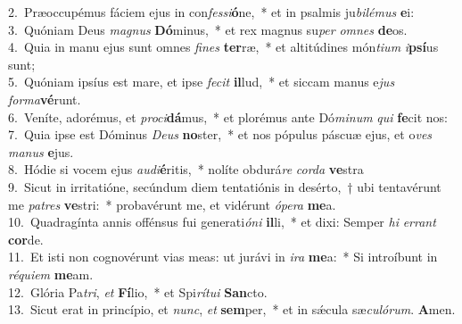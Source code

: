 {2.~}Præoccupémus fáciem ejus in con\textit{fes}\textit{si}\textbf{ó}ne,~* et in psalmis ju\textit{bi}\textit{lé}\textit{mus} \textbf{e}i:\\
{3.~}Quóniam Deus \textit{ma}\textit{gnus} \textbf{Dó}minus,~* et rex magnus su\textit{per} \textit{om}\textit{nes} \textbf{de}os.\\
{4.~}Quia in manu ejus sunt omnes \textit{fi}\textit{nes} \textbf{ter}ræ,~* et altitúdines món\textit{ti}\textit{um} \textit{i}\textbf{psí}us sunt;\\
{5.~}Quóniam ipsíus est mare, et ipse \textit{fe}\textit{cit} \textbf{il}lud,~* et siccam manus e\textit{jus} \textit{for}\textit{ma}\textbf{vé}runt.\\
{6.~}Veníte, adorémus, et \textit{pro}\textit{ci}\textbf{dá}mus,~* et plorémus ante Dó\textit{mi}\textit{num} \textit{qui} \textbf{fe}cit nos:\\
{7.~}Quia ipse est Dóminus \textit{De}\textit{us} \textbf{no}ster,~* et nos pópulus páscuæ ejus, et o\textit{ves} \textit{ma}\textit{nus} \textbf{e}jus.\\
{8.~}Hódie si vocem ejus \textit{au}\textit{di}\textbf{é}ritis,~* nolíte obdurá\textit{re} \textit{cor}\textit{da} \textbf{ve}stra\\
{9.~}Sicut in irritatióne, secúndum diem tentatiónis in desérto,~† ubi tentavérunt me \textit{pa}\textit{tres} \textbf{ve}stri:~* probavérunt me, et vidérunt \textit{ó}\textit{pe}\textit{ra} \textbf{me}a.\\
{10.~}Quadragínta annis offénsus fui generati\textit{ó}\textit{ni} \textbf{il}li,~* et dixi: Semper \textit{hi} \textit{er}\textit{rant} \textbf{cor}de.\\
{11.~}Et isti non cognovérunt vias meas: ut jurávi in \textit{i}\textit{ra} \textbf{me}a:~* Si introíbunt in \textit{ré}\textit{qui}\textit{em} \textbf{me}am.\\
{12.~}Glória Pa\textit{tri}, \textit{et} \textbf{Fí}lio,~* et Spi\textit{rí}\textit{tu}\textit{i} \textbf{San}cto.\\
{13.~}Sicut erat in princípio, et \textit{nunc}, \textit{et} \textbf{sem}per,~* et in sǽcula sæ\textit{cu}\textit{ló}\textit{rum}. \textbf{A}men.\\
